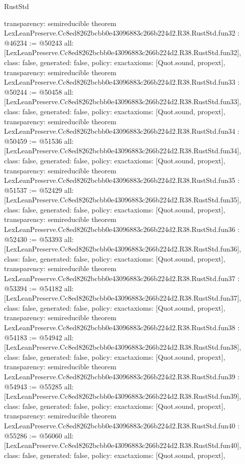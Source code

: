 \begin{lexlean}{RustStd}
\begin{coremodule}
{  transparency: semireducible
}
theorem LexLeanPreserve.Cc8ed8262bcbb0e43096883c266b224d2.R38.RustStd.fun32 : @46234 := @50243 {
  all: [LexLeanPreserve.Cc8ed8262bcbb0e43096883c266b224d2.R38.RustStd.fun32],
  class: false,
  generated: false,
  policy: exact{axioms: [Quot.sound, propext]},
  transparency: semireducible
}
theorem LexLeanPreserve.Cc8ed8262bcbb0e43096883c266b224d2.R38.RustStd.fun33 : @50244 := @50458 {
  all: [LexLeanPreserve.Cc8ed8262bcbb0e43096883c266b224d2.R38.RustStd.fun33],
  class: false,
  generated: false,
  policy: exact{axioms: [Quot.sound, propext]},
  transparency: semireducible
}
theorem LexLeanPreserve.Cc8ed8262bcbb0e43096883c266b224d2.R38.RustStd.fun34 : @50459 := @51536 {
  all: [LexLeanPreserve.Cc8ed8262bcbb0e43096883c266b224d2.R38.RustStd.fun34],
  class: false,
  generated: false,
  policy: exact{axioms: [Quot.sound, propext]},
  transparency: semireducible
}
theorem LexLeanPreserve.Cc8ed8262bcbb0e43096883c266b224d2.R38.RustStd.fun35 : @51537 := @52429 {
  all: [LexLeanPreserve.Cc8ed8262bcbb0e43096883c266b224d2.R38.RustStd.fun35],
  class: false,
  generated: false,
  policy: exact{axioms: [Quot.sound, propext]},
  transparency: semireducible
}
theorem LexLeanPreserve.Cc8ed8262bcbb0e43096883c266b224d2.R38.RustStd.fun36 : @52430 := @53393 {
  all: [LexLeanPreserve.Cc8ed8262bcbb0e43096883c266b224d2.R38.RustStd.fun36],
  class: false,
  generated: false,
  policy: exact{axioms: [Quot.sound, propext]},
  transparency: semireducible
}
theorem LexLeanPreserve.Cc8ed8262bcbb0e43096883c266b224d2.R38.RustStd.fun37 : @53394 := @54182 {
  all: [LexLeanPreserve.Cc8ed8262bcbb0e43096883c266b224d2.R38.RustStd.fun37],
  class: false,
  generated: false,
  policy: exact{axioms: [Quot.sound, propext]},
  transparency: semireducible
}
theorem LexLeanPreserve.Cc8ed8262bcbb0e43096883c266b224d2.R38.RustStd.fun38 : @54183 := @54942 {
  all: [LexLeanPreserve.Cc8ed8262bcbb0e43096883c266b224d2.R38.RustStd.fun38],
  class: false,
  generated: false,
  policy: exact{axioms: [Quot.sound, propext]},
  transparency: semireducible
}
theorem LexLeanPreserve.Cc8ed8262bcbb0e43096883c266b224d2.R38.RustStd.fun39 : @54943 := @55285 {
  all: [LexLeanPreserve.Cc8ed8262bcbb0e43096883c266b224d2.R38.RustStd.fun39],
  class: false,
  generated: false,
  policy: exact{axioms: [Quot.sound, propext]},
  transparency: semireducible
}
theorem LexLeanPreserve.Cc8ed8262bcbb0e43096883c266b224d2.R38.RustStd.fun40 : @55286 := @56060 {
  all: [LexLeanPreserve.Cc8ed8262bcbb0e43096883c266b224d2.R38.RustStd.fun40],
  class: false,
  generated: false,
  policy: exact{axioms: [Quot.sound, propext]},
}
\end{coremodule}
\end{lexlean}
